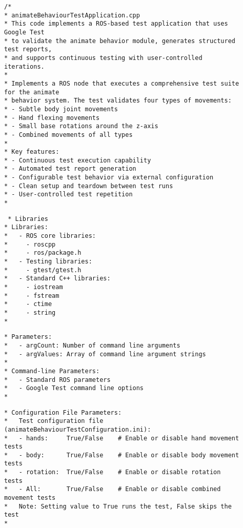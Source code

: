 \documentclass{CSSRforAfrica}
\newcommand{\checkboxChecked}{\fbox{\ding{51}}} %
\begin{document}
\begin{description}

\item[\checkboxChecked] 
 {\small 
\begin{verbatim}
/*
* animateBehaviourTestApplication.cpp
* This code implements a ROS-based test application that uses Google Test
* to validate the animate behavior module, generates structured test reports, 
* and supports continuous testing with user-controlled iterations.
* 
* Implements a ROS node that executes a comprehensive test suite for the animate
* behavior system. The test validates four types of movements:
* - Subtle body joint movements
* - Hand flexing movements
* - Small base rotations around the z-axis
* - Combined movements of all types
* 
* Key features:
* - Continuous test execution capability
* - Automated test report generation
* - Configurable test behavior via external configuration
* - Clean setup and teardown between test runs
* - User-controlled test repetition
*
\end{verbatim}}

\item[\checkboxChecked] 
 {\small 
\begin{verbatim}
 * Libraries
* Libraries:
*   - ROS core libraries:
*     - roscpp
*     - ros/package.h
*   - Testing libraries:
*     - gtest/gtest.h
*   - Standard C++ libraries:
*     - iostream
*     - fstream
*     - ctime
*     - string
* 
\end{verbatim}}

\item[\checkboxChecked] 
 {\small 
\begin{verbatim}
* Parameters:
*   - argCount: Number of command line arguments
*   - argValues: Array of command line argument strings
* 
* Command-line Parameters:
*   - Standard ROS parameters
*   - Google Test command line options
* 
\end{verbatim}}

\item[\checkboxChecked] 
 {\small 
\begin{verbatim}
* Configuration File Parameters:
*   Test configuration file (animateBehaviourTestConfiguration.ini):
*   - hands:     True/False    # Enable or disable hand movement tests
*   - body:      True/False    # Enable or disable body movement tests
*   - rotation:  True/False    # Enable or disable rotation tests
*   - All:       True/False    # Enable or disable combined movement tests
*   Note: Setting value to True runs the test, False skips the test
* 
\end{verbatim}}


\end{description}
\end{document}
